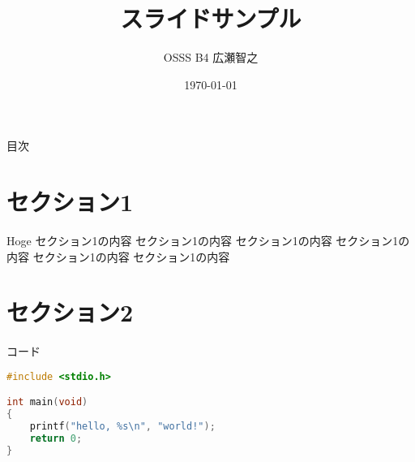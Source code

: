 \documentclass[unicode,12pt]{beamer}
\title{スライドサンプル}
\author{OSSS B4 広瀬智之}
\date{\today}
\begin{document}
\begin{frame}[plain]
  \titlepage
\end{frame}

\begin{frame}[plain]{目次}
  \tableofcontents
\end{frame}

\section{セクション1}
\begin{frame}[plain]{Hoge}
  セクション1の内容
  セクション1の内容
  セクション1の内容
  セクション1の内容
  セクション1の内容
  セクション1の内容
\end{frame}

\section{セクション2}
\begin{frame}[fragile]{コード}
\begin{lstlisting}[language=c,caption=サンプルコード,label=code:sample]
#include <stdio.h>

int main(void)
{
    printf("hello, %s\n", "world!");
    return 0;
}
\end{lstlisting}
\end{frame}
\end{document}
